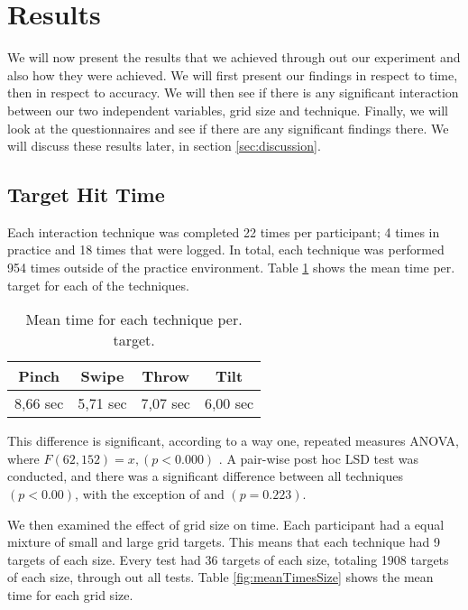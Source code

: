 \section{Results}
We will now present the results that we achieved through out our experiment and also how they were achieved. We will first present our findings in respect to time, then in respect to accuracy. We will then see if there is any significant interaction between our two independent variables, grid size and technique. Finally, we will look at the questionnaires and see if there are any significant findings there. We will discuss these results later, in section \ref{sec:discussion}.  

\subsection{Target Hit Time}

Each interaction technique was completed 22 times per participant; 4 times in practice and 18 times that were logged. In total, each technique was performed 954 times outside of the practice environment. Table \ref{tab:meanTimesTechnique} shows the mean time per. target for each of the techniques. 
\begin{table}[]
	\centering
	\label{tab:meanTimesTechnique}
	\begin{tabular}{|c|c|c|c|}
		\hline
		\rowcolor[HTML]{9B9B9B} 
		\textbf{Pinch} & \textbf{Swipe} & \textbf{Throw} & \textbf{Tilt} \\ \hline
		8,66  sec         & 5,71 sec          & 7,07 sec          & 6,00 sec         \\ \hline
	\end{tabular}
	\caption{Mean time for each technique per. target.}
\end{table}

This difference is significant, according to a way one, repeated measures ANOVA, where $F(62,152) = x, (p<0.000)$ . A pair-wise post hoc LSD test was conducted, and there was a significant difference between all techniques $(p<0.00)$, with the exception of \swipe and \tilt $(p=0.223)$. 

We then examined the effect of grid size on time. Each participant had a equal mixture of small and large grid targets. This means that each technique had 9 targets of each size. Every test had 36 targets of each size, totaling 1908 targets of each size, through out all tests. Table \ref{fig:meanTimesSize} shows the mean time for each grid size. 

